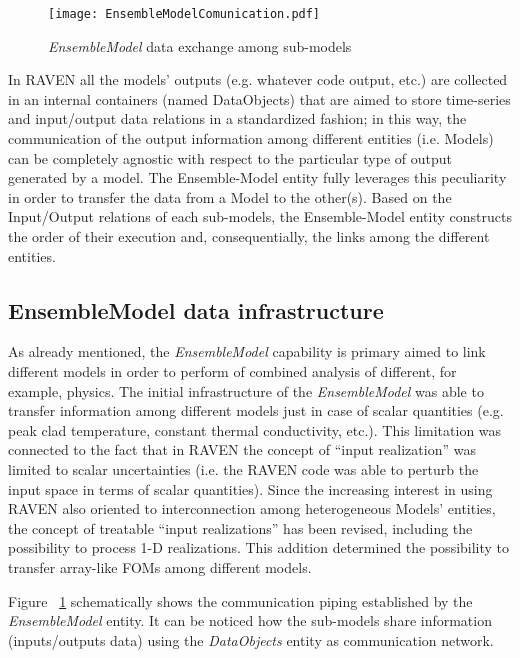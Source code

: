 \begin{figure}
    \centering
    \texttt{[image: EnsembleModelComunication.pdf]}
    \caption{\textit{EnsembleModel} data exchange among sub-models}
    \label{fig:ensembleModelComunication}
\end{figure}

In RAVEN all the models’ outputs (e.g. whatever code output, etc.) are collected in an 
internal containers
(named DataObjects) that are aimed to store time-series and input/output data relations 
in a standardized
fashion; in this way, the communication of the output information among different 
entities (i.e. Models) can be
completely agnostic with respect to the particular type of output generated by a model. 
The Ensemble-Model
entity fully leverages this peculiarity in order to transfer the data from a Model to the 
other(s). 
Based on the Input/Output relations of each sub-models, the Ensemble-Model entity 
constructs the order of
their execution and, consequentially, the links among the different entities. 

\subsection{EnsembleModel data infrastructure}
\label{subsec:ensemblemodelDataInfrastructure}
As already mentioned, the \textit{EnsembleModel} capability is primary aimed
to link different models in order to perform of combined analysis of different, for example,
physics. 
The initial infrastructure of the \textit{EnsembleModel}  was able to 
transfer information
among different models just in case of scalar quantities (e.g. peak clad temperature, 
constant thermal
conductivity, etc.). This limitation was connected to the fact that in RAVEN the 
concept of ``input realization''
was limited to scalar uncertainties (i.e. the RAVEN code was able to perturb the input 
space in terms of scalar
quantities). Since the increasing interest in using RAVEN also oriented to 
interconnection among heterogeneous
Models’ entities, the concept of treatable ``input realizations'' has been revised, including 
the possibility to process 1-D realizations. This addition determined the possibility to transfer
array-like FOMs among different models. 

Figure ~\ref{fig:ensembleModelComunication} schematically shows the communication 
piping established by the 
\textit{EnsembleModel} entity. It can be noticed how the sub-models share information (inputs/outputs data) using 
the \textit{DataObjects} entity as communication network.
